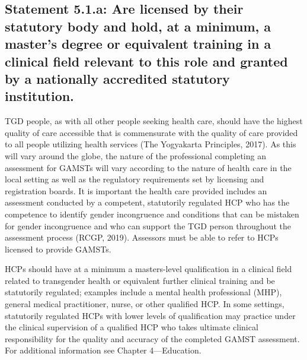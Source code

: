 \documentclass[
]{book}
\begin{document}
\hypertarget{statement-5.1.a-are-licensed-by-their-statutory-body-and-hold-at-a-minimum-a-masters-degree-or-equivalent-training-in-a-clinical-field-relevant-to-this-role-and-granted-by-a-nationally-accredited-statutory-institution.}{%
\subsection*{Statement 5.1.a: Are licensed by their statutory body and hold, at a minimum, a master's degree or equivalent training in a clinical field relevant to this role and granted by a nationally accredited statutory institution.}\label{statement-5.1.a-are-licensed-by-their-statutory-body-and-hold-at-a-minimum-a-masters-degree-or-equivalent-training-in-a-clinical-field-relevant-to-this-role-and-granted-by-a-nationally-accredited-statutory-institution.}}

TGD people, as with all other people seeking
health care, should have the highest quality of care
accessible that is commensurate with the quality
of care provided to all people utilizing health services (The Yogyakarta Principles, 2017). As this
will vary around the globe, the nature of the professional completing an assessment for GAMSTs
will vary according to the nature of health care in
the local setting as well as the regulatory requirements set by licensing and registration boards. It
is important the health care provided includes an
assessment conducted by a competent, statutorily
regulated HCP who has the competence to identify
gender incongruence and conditions that can be
mistaken for gender incongruence and who can
support the TGD person throughout the assessment process (RCGP, 2019). Assessors must be able
to refer to HCPs licensed to provide GAMSTs.

HCPs should have at a minimum a masters-level
qualification in a clinical field related to transgender health or equivalent further clinical training
and be statutorily regulated; examples include a
mental health professional (MHP), general medical
practitioner, nurse, or other qualified HCP. In some
settings, statutorily regulated HCPs with lower levels of qualification may practice under the clinical
supervision of a qualified HCP who takes ultimate
clinical responsibility for the quality and accuracy
of the completed GAMST assessment. For additional information see Chapter 4---Education.
\end{document}
